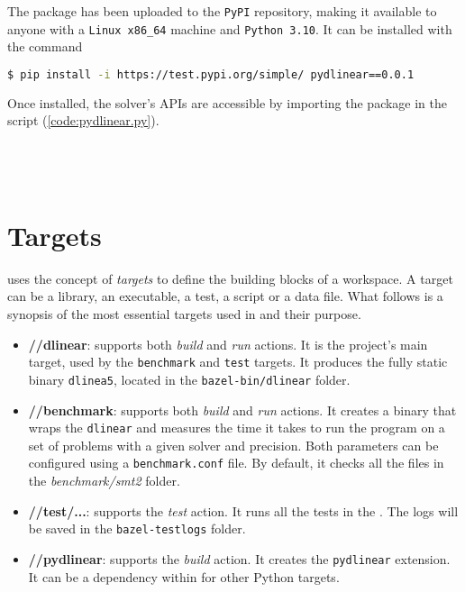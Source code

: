 

The package has been uploaded to the \texttt{PyPI} repository, making it available to anyone with a \texttt{Linux x86\_64} machine and \texttt{Python 3.10}.
It can be installed with the command

\begin{lstlisting}[language=bash,frame=single,showstringspaces=false]
$ pip install -i https://test.pypi.org/simple/ pydlinear==0.0.1
\end{lstlisting}
Once installed, the solver's APIs are accessible by importing the \pydlinear package in the script (\autoref{code:pydlinear.py}). \\ \\ \\ \\



\section{Targets}

\bazel uses the concept of \textit{targets} to define the building blocks of a workspace.
A target can be a library, an executable, a test, a script or a data file.
What follows is a synopsis of the most essential targets used in \dlinear and their purpose.

\begin{itemize}
        \item \textbf{//dlinear}: supports both \textit{build} and \textit{run} actions.
              It is the project's main target, used by the \texttt{benchmark} and \texttt{test} targets.
              It produces the fully static binary \texttt{dlinea5}, located in the \texttt{bazel-bin/dlinear} folder.
        \item \textbf{//benchmark}: supports both \textit{build} and \textit{run} actions.
              It creates a binary that wraps the \texttt{dlinear} and measures the time it takes to run the program on a set of problems with a given solver and precision.
              Both parameters can be configured using a \texttt{benchmark.conf} file.
              By default, it checks all the files in the \textit{benchmark/smt2} folder.
        \item \textbf{//test/...}: supports the \textit{test} action.
              It runs all the tests in the \dlinear.
              The logs will be saved in the \texttt{bazel-testlogs} folder.
        \item \textbf{//pydlinear}: supports the \textit{build} action.
              It creates the \texttt{pydlinear} extension.
              It can be a dependency within \bazel for other Python targets.
\end{itemize}
